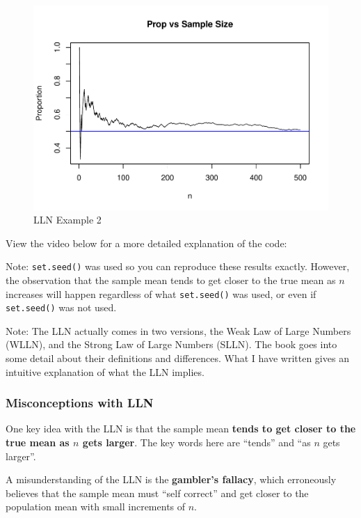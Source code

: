 \documentclass[
]{book}
\begin{document}
\begin{figure}
\centering
\includegraphics{bookdown-demo_files/figure-latex/4-LLN2-1.pdf}
\caption{\label{fig:4-LLN2}LLN Example 2}
\end{figure}

View the video below for a more detailed explanation of the code:

Note: \texttt{set.seed()} was used so you can reproduce these results exactly. However, the observation that the sample mean tends to get closer to the true mean as \(n\) increases will happen regardless of what \texttt{set.seed()} was used, or even if \texttt{set.seed()} was not used.

Note: The LLN actually comes in two versions, the Weak Law of Large Numbers (WLLN), and the Strong Law of Large Numbers (SLLN). The book goes into some detail about their definitions and differences. What I have written gives an intuitive explanation of what the LLN implies.

\hypertarget{misconceptions-with-lln}{%
\subsubsection{Misconceptions with LLN}\label{misconceptions-with-lln}}

One key idea with the LLN is that the sample mean \textbf{tends to get closer to the true mean as \(n\) gets larger}. The key words here are ``tends'' and ``as \(n\) gets larger''.

A misunderstanding of the LLN is the \textbf{gambler's fallacy}, which erroneously believes that the sample mean must ``self correct'' and get closer to the population mean with small increments of \(n\).
\end{document}
